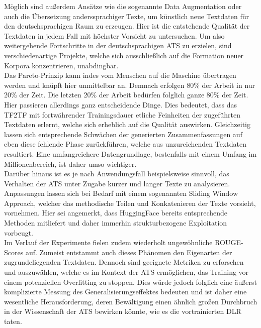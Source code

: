 \noindent
Möglich sind außerdem Ansätze wie die sogenannte Data Augmentation oder auch die Übersetzung anderssprachiger Texte, um künstlich neue Textdaten für den deutschsprachigen Raum zu erzeugen. Hier ist die entstehende Qualität der Textdaten in jedem Fall mit höchster Vorsicht zu untersuchen. Um also weitergehende Fortschritte in der deutschsprachigen \ac{ATS} zu erzielen, sind verschiedenartige Projekte, welche sich ausschließlich auf die Formation neuer Korpora konzentrieren, unabdingbar.\\

\noindent
Das Pareto-Prinzip kann indes vom Menschen auf die Maschine übertragen werden und knüpft hier unmittelbar an. Demnach erfolgen 80\% der Arbeit in nur 20\% der Zeit. Die letzten 20\% der Arbeit bedürfen folglich ganze 80\% der Zeit. Hier passieren allerdings ganz entscheidende Dinge. Dies bedeutet, dass das \ac{TF2TF} mit fortwährender Trainingsdauer etliche Feinheiten der zugeführten Textdaten erlernt, welche sich erheblich auf die Qualität auswirken. Gleichzeitig lassen sich entsprechende Schwächen der generierten Zusammenfassungen auf eben diese fehlende Phase zurückführen, welche aus unzureichenden Textdaten resultiert. Eine umfangreichere Datengrundlage, bestenfalls mit einem Umfang im Millionenbereich, ist daher umso wichtiger.\\

\noindent
Darüber hinaus ist es je nach Anwendungsfall beispielsweise sinnvoll, das Verhalten der \ac{ATS} unter Zugabe kurzer und langer Texte zu analysieren. Anpassungen lassen sich bei Bedarf mit einem sogenannten Sliding Window Approach, welcher das methodische Teilen und Konkatenieren der Texte vorsieht, vornehmen. Hier sei angemerkt, dass HuggingFace bereits entsprechende Methoden mitliefert und daher immerhin strukturbezogene Exploitation vorbeugt.\\

\noindent
Im Verlauf der Experimente fielen zudem wiederholt ungewöhnliche \ac{ROUGE}-Scores auf. Zumeist entstammt auch dieses Phänomen den Eigenarten der zugrundeliegenden Textdaten. Dennoch sind geeignete Metriken zu erforschen und auszuwählen, welche es im Kontext der \ac{ATS} ermöglichen, das Training vor einem potenziellen Overfitting zu stoppen. Dies würde jedoch folglich eine äußerst komplizierte Messung des Generalisierungseffektes bedeuten und ist daher eine wesentliche Herausforderung, deren Bewältigung einen ähnlich großen Durchbruch in der Wissenschaft der \ac{ATS} bewirken könnte, wie es die vortrainierten \ac{DLR} taten.\\

